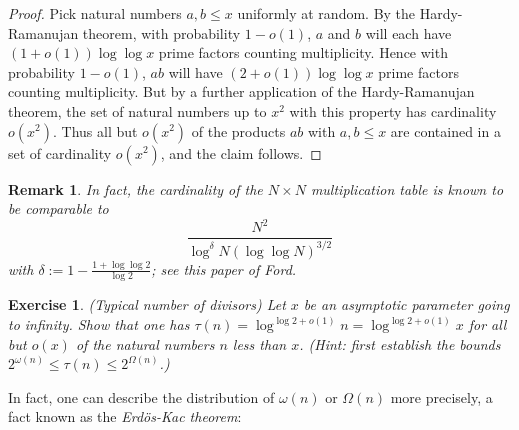 \documentclass[10pt,reqno]{amsart}
\newtheorem{exercise}[theorem]{Exercise}
\newtheorem{remark}[theorem]{Remark}
\begin{document}
\begin{proof} Pick natural numbers $a,b \leq x$ uniformly at random. By the Hardy-Ramanujan theorem, with probability $1-o(1)$, $a$ and $b$ will each have $(1+o(1)) \log\log x$ prime factors counting multiplicity. Hence with probability $1-o(1)$, $ab$ will have $(2+o(1)) \log\log x$ prime factors counting multiplicity. But by a further application of the Hardy-Ramanujan theorem, the set of natural numbers up to $x^2$ with this property has cardinality $o(x^2)$. Thus all but $o(x^2)$ of the products $ab$ with $a,b \leq x$ are contained in a set of cardinality $o(x^2)$, and the claim follows. %
\end{proof}

\begin{remark}
    In fact, the cardinality of the $N \times N$ multiplication table is known to be comparable to
    \[ \frac{N^2}{\log^\delta N (\log\log N)^{3/2}} \]
    with $\delta := 1 - \frac{1+\log\log 2}{\log 2}$; see \emph{this paper of Ford}.
\end{remark}

\begin{exercise}
    (Typical number of divisors) Let $x$ be an asymptotic parameter going to infinity. Show that one has $\tau(n) = \log^{\log 2+o(1)} n = \log^{\log 2+o(1)} x$ for all but $o(x)$ of the natural numbers $n$ less than $x$. (Hint: first establish the bounds $2^{\omega(n)} \leq \tau(n) \leq 2^{\Omega(n)}$.)
\end{exercise}

In fact, one can describe the distribution of $\omega(n)$ or $\Omega(n)$ more precisely, a fact known as the \emph{Erdös-Kac theorem}:
\end{document}
